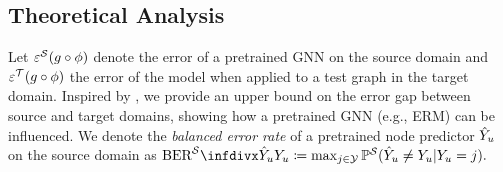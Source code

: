 \subsection{Theoretical Analysis}






Let $\varepsilon^\mathcal{S}(g \circ \phi)$ denote the error of a pretrained GNN on the source domain and $\varepsilon^\mathcal{T}(g \circ \phi)$ the error of the model when applied to a test graph in the target domain.
Inspired by \citet{tachet2020domain}, we provide an upper bound on the error gap between source and target domains, showing how a pretrained GNN (e.g., ERM) can be influenced. 
We denote the \emph{balanced error rate} of a pretrained node predictor $\hat{Y}_u$ on the source domain as
        $\balerrorrate{\predy_u}{\rvY_u} \coloneq \max_{j \in \mathcal{Y}} \probs(\predy_u\neq\rvY_u | \rvY_u=j).$

